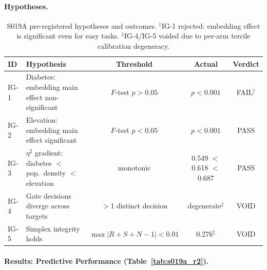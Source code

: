 \documentclass{article}
\begin{document}
\paragraph{Hypotheses.}
\begin{table}[htbp]
\centering
\small
\caption{S019A pre-registered hypotheses and outcomes. $^\dagger$IG-1 rejected: embedding effect is significant even for easy tasks. $^\ddagger$IG-4/IG-5 voided due to per-arm tercile calibration degeneracy.}
\label{tab:s019a_hypotheses}
\begin{tabular}{llccc}
\toprule
\textbf{ID} & \textbf{Hypothesis} & \textbf{Threshold} & \textbf{Actual} & \textbf{Verdict} \\
\midrule
IG-1 & Diabetes: embedding main effect non-significant & $F$-test $p > 0.05$ & $p < 0.001$ & FAIL$^\dagger$ \\
IG-2 & Elevation: embedding main effect significant & $F$-test $p < 0.05$ & $p < 0.001$ & PASS \\
IG-3 & $\eta^2$ gradient: diabetes $<$ pop.\ density $<$ elevation & monotonic & 0.549 $<$ 0.618 $<$ 0.687 & PASS \\
IG-4 & Gate decisions diverge across targets & $>$1 distinct decision & degenerate$^\ddagger$ & VOID \\
IG-5 & Simplex integrity holds & $\max|R+S+N-1| < 0.01$ & 0.276$^\ddagger$ & VOID \\
\bottomrule
\end{tabular}
\end{table}


\paragraph{Results: Predictive Performance (Table~\ref{tab:s019a_r2}).}
\end{document}
